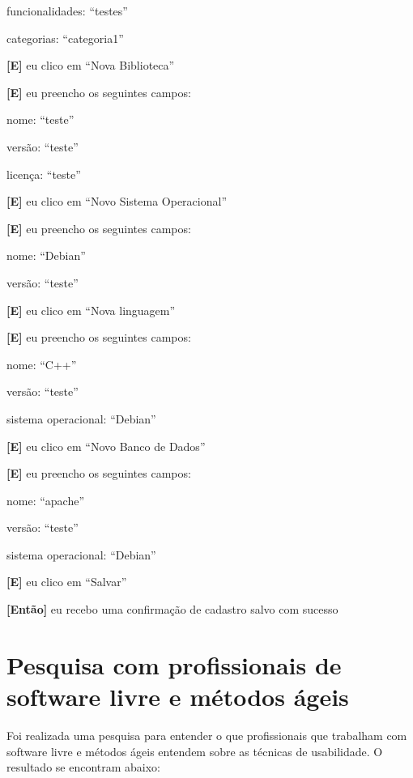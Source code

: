\begin{itemize}
        \subitem funcionalidades: ``testes''

        \subitem categorias: ``categoria1''
    
    \textbf{[E]} eu clico em ``Nova Biblioteca''

    \textbf{[E]} eu preencho os seguintes campos: 

        \subitem nome: ``teste''

        \subitem versão: ``teste''

        \subitem licença: ``teste''

    \textbf{[E]} eu clico em ``Novo Sistema Operacional''

    \textbf{[E]} eu preencho os seguintes campos: 

        \subitem nome: ``Debian''

        \subitem versão: ``teste''

    \textbf{[E]} eu clico em ``Nova linguagem''

    \textbf{[E]} eu preencho os seguintes campos: 

        \subitem nome: ``C++''

        \subitem versão: ``teste''

        \subitem sistema operacional: ``Debian''

    \textbf{[E]} eu clico em ``Novo Banco de Dados''

    \textbf{[E]} eu preencho os seguintes campos: 

        \subitem nome: ``apache''

        \subitem versão: ``teste''

        \subitem sistema operacional: ``Debian''

    \textbf{[E]} eu clico em ``Salvar''

    \textbf{[Então]} eu recebo uma confirmação de cadastro salvo com sucesso
    
    
\end{itemize}

\newpage

\section{Pesquisa com profissionais de software livre e métodos ágeis}

	Foi realizada uma pesquisa para entender o que profissionais que trabalham com software livre e métodos ágeis entendem sobre as técnicas de usabilidade. O resultado se encontram abaixo:
	
